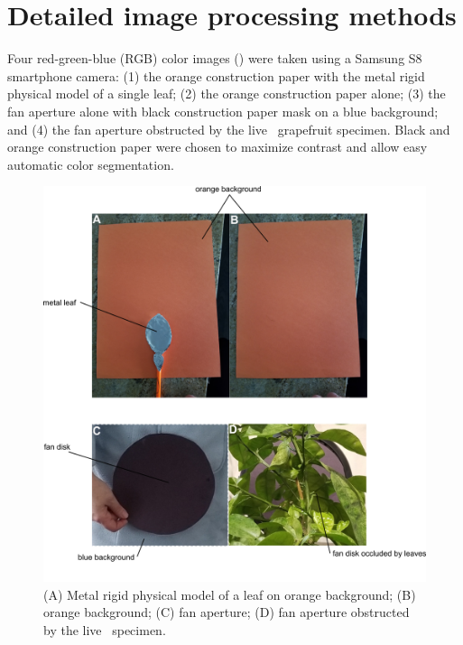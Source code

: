 \section{Detailed image processing methods}
\label{sec:A}

Four red-green-blue (RGB) color images () were taken using a Samsung S8 smartphone camera: (1) the orange construction paper with the metal rigid physical model of a single leaf; (2) the orange construction paper alone; (3) the fan aperture alone with black construction paper mask on a blue background; and (4) the fan aperture obstructed by the live \Cxparadisi\ grapefruit specimen. Black and orange construction paper were chosen to maximize contrast and allow easy automatic color segmentation. 
\begin{figure}
\begin{center}
\includegraphics{figures/fig7.png}
\end{center}
\caption{(A) Metal rigid physical model of a leaf on orange background; (B) orange background; (C) fan aperture; (D) fan aperture obstructed by the live \Cxparadisi\ specimen.}
\label{fig:app:images}
\end{figure}


